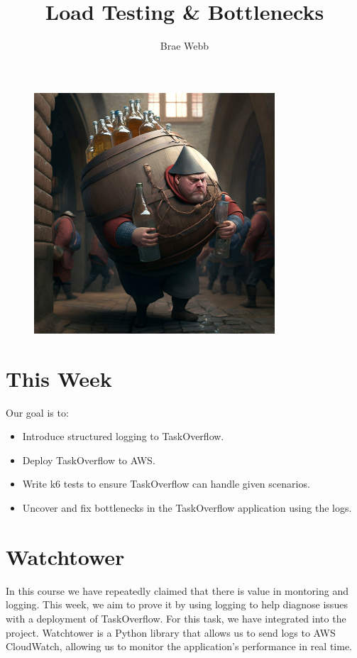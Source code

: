 \documentclass{csse4400}
\title{Load Testing \& Bottlenecks}
\author{Brae Webb}
\date{\week[practical]{9}}
\begin{document}
\maketitle

\begin{figure}[h]
    \centering
    \includegraphics[width=0.8\textwidth]{images/bottleneck}
\end{figure}


\section{This Week}
Our goal is to:
\begin{itemize}
  \item Introduce structured logging to TaskOverflow.
  \item Deploy TaskOverflow to AWS.
  \item Write k6 tests to ensure TaskOverflow can handle given scenarios.
  \item Uncover and fix bottlenecks in the TaskOverflow application using the logs.
\end{itemize}

\section{Watchtower}
In this course we have repeatedly claimed that there is value in montoring and logging.
This week, we aim to prove it by using logging to help diagnose issues with a deployment of TaskOverflow.
For this task, we have integrated  into the project.
Watchtower is a Python library that allows us to send logs to AWS CloudWatch,
allowing us to monitor the application's performance in real time.
\end{document}
